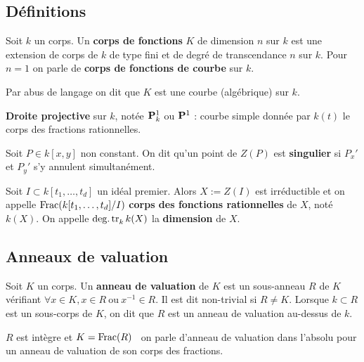 \subsection{Définitions}

	\begin{defn}
		Soit $k$ un corps.
		Un \textbf{corps de fonctions} $K$ de dimension $n$ sur $k$ est une extension de corps de $k$ de type fini et de degré de transcendance $n$ sur $k$.
		Pour $n = 1$ on parle de \textbf{corps de fonctions de courbe} sur $k$.
	\end{defn}

	Par abus de langage on dit que $K$ est une courbe (algébrique) sur $k$.
	
	\begin{defn}
		\textbf{Droite projective} sur $k$, notée $\mathbf{P}_k^1$ ou $\mathbf{P}^1$ : courbe simple donnée par $k(t)$ le corps des fractions rationnelles.
	\end{defn}
	
	\begin{defn}
		Soit $P \in k[x,y]$ non constant.
		On dit qu'un point de $Z(P)$ est \textbf{singulier} si $P_x'$ et $P_y'$ s'y annulent simultanément.
	\end{defn}
	
	\begin{defn}
		Soit $I \subset k[t_1,\ldots,t_d]$ un idéal premier.
		Alors $X := Z(I)$ est irréductible et on appelle $\operatorname{Frac}(k[t_1,\ldots,t_d]/I)$ \textbf{corps des fonctions rationnelles} de $X$, noté $k(X)$.
		On appelle $\operatorname{deg. tr}_k k(X)$ la \textbf{dimension} de $X$.
	\end{defn}

\subsection{Anneaux de valuation}

	\begin{defn}
		Soit $K$ un corps.
		Un \textbf{anneau de valuation} de $K$ est un sous-anneau $R$ de $K$ vérifiant $\forall x \in K, x \in R\ \text{ou}\ x^{-1} \in R$.
		Il est dit non-trivial si $R \neq K$.
		Lorsque $k \subset R$ est un sous-corps de $K$, on dit que $R$ est un anneau de valuation au-dessus de $k$.
	\end{defn}

	\begin{rem}
		$R$ est intègre et $K = \operatorname{Frac}(R)$ \textrightarrow\ on parle d'anneau de valuation dans l'absolu pour un anneau de valuation de son corps des fractions.
	\end{rem}

